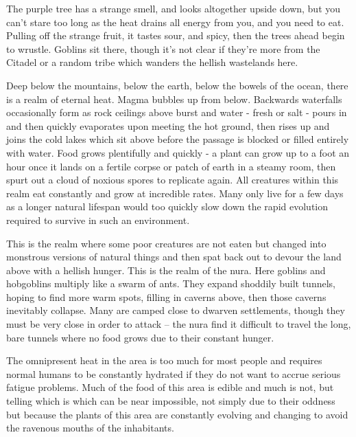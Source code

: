 \begin{multicols}{2}

\begin{boxtext}

	The purple tree has a strange smell, and looks altogether upside down, but you can't stare too long as the heat drains all energy from you, and you need to eat.
Pulling off the strange fruit, it tastes sour, and spicy, then the trees ahead begin to wrustle.
Goblins sit there, though it's not clear if they're more from the Citadel or a random tribe which wanders the hellish wastelands here.

\end{boxtext}

Deep below the mountains, below the earth, below the bowels of the ocean, there is a realm of eternal heat.  Magma bubbles up from below.  Backwards waterfalls occasionally form as rock ceilings above burst and water - fresh or salt - pours in and then quickly evaporates upon meeting the hot ground, then rises up and joins the cold lakes which sit above before the passage is blocked or filled entirely with water.  Food grows plentifully and quickly - a plant can grow up to a foot an hour once it lands on a fertile corpse or patch of earth in a steamy room, then spurt out a cloud of noxious spores to replicate again.  All creatures within this realm eat constantly and grow at incredible rates.  Many only live for a few days as a longer natural lifespan would too quickly slow down the rapid evolution required to survive in such an environment.

	This is the realm where some poor creatures are not eaten but changed into monstrous versions of natural things and then spat back out to devour the land above with a hellish hunger.  This is the realm of the nura.  Here goblins and hobgoblins multiply like a swarm of ants.  They expand shoddily built tunnels, hoping to find more warm spots, filling in caverns above, then those caverns inevitably collapse.  Many are camped close to dwarven settlements, though they must be very close in order to attack -- the nura find it difficult to travel the long, bare tunnels where no food grows due to their constant hunger.

	The omnipresent heat in the area is too much for most people and requires normal humans to be constantly hydrated if they do not want to accrue serious fatigue problems.  Much of the food of this area is edible and much is not, but telling which is which can be near impossible, not simply due to their oddness but because the plants of this area are constantly evolving and changing to avoid the ravenous mouths of the inhabitants.


\end{multicols}
